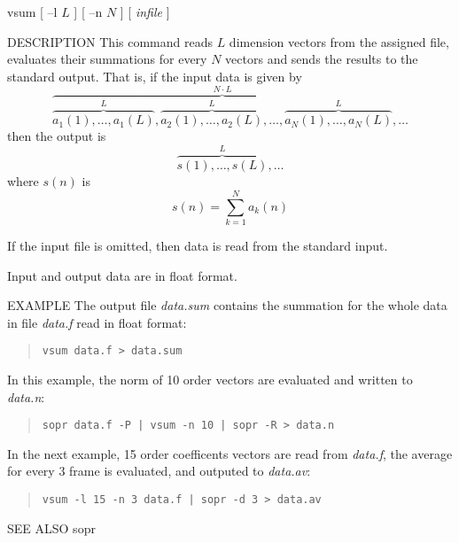 
\begin{synopsis}
\item[vsum] [ --l $L$ ] [ --n $N$ ] [ {\em infile} ]
\end{synopsis}

\begin{qsection}{DESCRIPTION}
This command reads $L$ dimension vectors from the assigned file,
evaluates their summations for every $N$ vectors and sends the
results to the standard output.
That is, if the input data is given by
\begin{displaymath}
\overbrace{
  \overbrace{a_1(1),\ldots,a_1(L)}^{L},
  \overbrace{a_2(1),\ldots,a_2(L)}^{L},\ldots,
  \overbrace{a_N(1),\ldots,a_N(L)}^{L}
}^{N \cdot L},\ldots
\end{displaymath}
then the output is 
\begin{displaymath}
  \overbrace{s(1),\ldots,s(L)}^{L},\ldots
\end{displaymath}
where $s(n)$ is
\begin{displaymath}
  s(n)=\sum_{k=1}^{N} a_k(n)
\end{displaymath}
\par
If the input file is omitted, then data is read from the standard input.
\par
Input and output data are in float format.
\end{qsection}

\begin{options}
\end{options}

\begin{qsection}{EXAMPLE}
The output file {\em data.sum} contains the summation for
the whole data in file {\em data.f} read in float format:
\begin{quote}
  \verb!vsum data.f > data.sum!
\end{quote}
\par
In this example, the norm of 10 order vectors are
evaluated and written to {\em data.n}:
\begin{quote}
  \verb!sopr data.f -P | vsum -n 10 | sopr -R > data.n!
\end{quote}
\par
In the next example, 15 order coefficents vectors are read
from {\em data.f}, the average for every 3 frame is evaluated,
and outputed to {\em data.av}:
\begin{quote}
  \verb!vsum -l 15 -n 3 data.f | sopr -d 3 > data.av!
\end{quote}
\end{qsection}

\begin{qsection}{SEE ALSO}
  sopr
\end{qsection}
